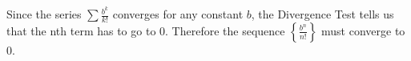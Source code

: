 \documentclass[10pt]{article}
\newenvironment{red}{\color{red}}{\ignorespacesafterend}
\begin{document}
\begin{enumerate}[leftmargin=0pt]
\begin{enumerate}
    \begin{red}
    Since the series $\sum \frac{b^k}{k!}$ converges for any constant $b$, the Divergence Test tells us that the nth term has to go to 0. Therefore the sequence $\left\{\frac{b^n}{n!}\right\}$ must converge to 0.
    \end{red}
\end{enumerate}

\end{enumerate}
\end{document}
